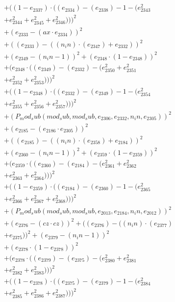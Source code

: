\documentclass[10pt, a4paper]{article}
\begin{document}
\begin{small}
\begin{align*}
& + ((1 - e_{2337})  \cdot  ((e_{2334}) - (e_{2338}) - 1 - (e_{2343}^{2} \\
& + e_{2344}^{2} + e_{2345}^{2} + e_{2346}^{2})))^{2} \\
& + (e_{2333} - (ax  \cdot  e_{2334}))^{2} \\
& + ((e_{2333}) - ((n_in)  \cdot  (e_{2347}) + e_{2332}))^{2} \\
& + (e_{2349} - (n_in - 1))^{2} + (e_{2348}  \cdot  (1 - e_{2348}))^{2} \\
& + (e_{2348}  \cdot  ((e_{2349}) - (e_{2332}) - (e_{2350}^{2} + e_{2351}^{2} \\
& + e_{2352}^{2} + e_{2353}^{2})))^{2} \\
& + ((1 - e_{2348})  \cdot  ((e_{2332}) - (e_{2349}) - 1 - (e_{2354}^{2} \\
& + e_{2355}^{2} + e_{2356}^{2} + e_{2357}^{2})))^{2} \\
& + (P_mod_sub(mod_sub, mod_sub, e_{2306}, e_{2332}, n_in, e_{2305}))^{2} \\
& + (e_{2185} - (e_{2186}  \cdot  e_{2305}))^{2} \\
& + ((e_{2185}) - ((n_in)  \cdot  (e_{2358}) + e_{2184}))^{2} \\
& + (e_{2360} - (n_in - 1))^{2} + (e_{2359}  \cdot  (1 - e_{2359}))^{2} \\
& + (e_{2359}  \cdot  ((e_{2360}) - (e_{2184}) - (e_{2361}^{2} + e_{2362}^{2} \\
& + e_{2363}^{2} + e_{2364}^{2})))^{2} \\
& + ((1 - e_{2359})  \cdot  ((e_{2184}) - (e_{2360}) - 1 - (e_{2365}^{2} \\
& + e_{2366}^{2} + e_{2367}^{2} + e_{2368}^{2})))^{2} \\
& + (P_mod_sub(mod_sub, mod_sub, e_{2013}, e_{2184}, n_in, e_{2012}))^{2} \\
& + (e_{2376} - (cz  \cdot  cz))^{2} + ((e_{2376}) - ((n_in)  \cdot  (e_{2377}) \\
& + e_{2375}))^{2} + (e_{2379} - (n_in - 1))^{2} \\
& + (e_{2378}  \cdot  (1 - e_{2378}))^{2} \\
& + (e_{2378}  \cdot  ((e_{2379}) - (e_{2375}) - (e_{2380}^{2} + e_{2381}^{2} \\
& + e_{2382}^{2} + e_{2383}^{2})))^{2} \\
& + ((1 - e_{2378})  \cdot  ((e_{2375}) - (e_{2379}) - 1 - (e_{2384}^{2} \\
& + e_{2385}^{2} + e_{2386}^{2} + e_{2387}^{2})))^{2} \\

\end{align*}
\end{small}
\end{document}
